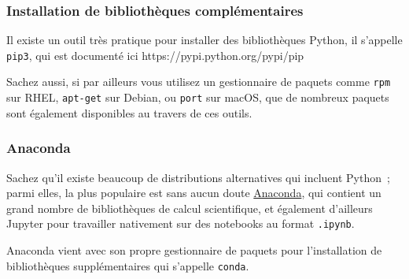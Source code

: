     \hypertarget{installation-de-bibliothuxe8ques-compluxe9mentaires}{%
\subsubsection{Installation de bibliothèques
complémentaires}\label{installation-de-bibliothuxe8ques-compluxe9mentaires}}

    Il existe un outil très pratique pour installer des bibliothèques
Python, il s'appelle \texttt{pip3}, qui est documenté ici
https://pypi.python.org/pypi/pip

    Sachez aussi, si par ailleurs vous utilisez un gestionnaire de paquets
comme \texttt{rpm} sur RHEL, \texttt{apt-get} sur Debian, ou
\texttt{port} sur macOS, que de nombreux paquets sont également
disponibles au travers de ces outils.

    \hypertarget{anaconda}{%
\subsubsection{Anaconda}\label{anaconda}}

    Sachez qu'il existe beaucoup de distributions alternatives qui incluent
Python~; parmi elles, la plus populaire est sans aucun doute
\href{https://www.anaconda.com/}{Anaconda}, qui contient un grand nombre
de bibliothèques de calcul scientifique, et également d'ailleurs Jupyter
pour travailler nativement sur des notebooks au format \texttt{.ipynb}.

Anaconda vient avec son propre gestionnaire de paquets pour
l'installation de bibliothèques supplémentaires qui s'appelle
\texttt{conda}.


    
    
    
